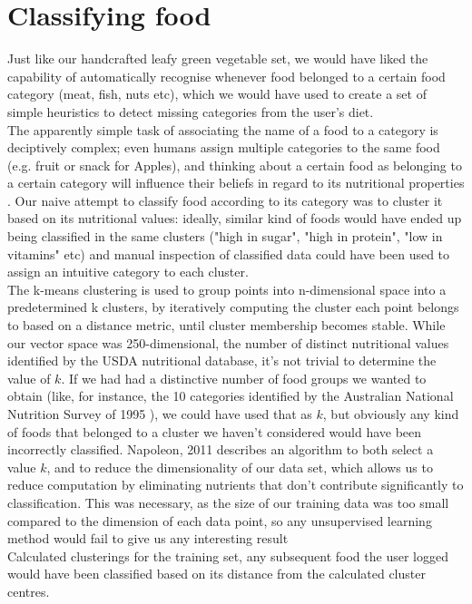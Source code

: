 \section*{Classifying food}
Just like our handcrafted leafy green vegetable set, we would have liked the capability of automatically recognise whenever food belonged to a certain food category (meat, fish, nuts etc), which we would have used to create a set of simple heuristics to detect missing categories from the user's diet. \\
The apparently simple task of associating the name of a food to a category is deciptively complex; even humans assign multiple categories to the same food (e.g. fruit or snack for Apples), and thinking about a certain food as belonging to a certain category will influence their beliefs in regard to its nutritional properties \cite{Hayes2011}.
Our naive attempt to classify food  according to its category was to cluster it based on its nutritional values: ideally, similar kind of foods would have ended up being classified in the same clusters ("high in sugar", "high in protein", "low in vitamins" etc) and manual inspection of classified data could have been used to assign an intuitive category to each cluster. \\
The k-means clustering is used to group points into n-dimensional space into a predetermined k clusters, by iteratively computing the cluster each point belongs to based on a distance metric, until cluster membership becomes stable. While our vector space was 250-dimensional, the number of distinct nutritional values identified by the USDA nutritional database, it's not trivial to determine the value of $k$. If we had had a distinctive number of food groups we wanted to obtain (like, for instance, the 10 categories identified by the Australian National Nutrition Survey of 1995 \cite{NSS1995}), we could have used that as $k$, but obviously any kind of foods that belonged to a cluster we haven't considered would have been incorrectly classified. Napoleon, 2011 \cite{Napoleon, 2011} describes an algorithm to both select a value $k$, and to reduce the dimensionality of our data set, which allows us to reduce computation by eliminating nutrients that don't contribute significantly to classification. This was necessary, as the size of our training data was too small compared to the dimension of each data point, so any unsupervised learning method would fail to give us any interesting result \cite{} \\
Calculated clusterings for the training set, any subsequent food the user logged would have been classified based on its distance from the calculated cluster centres.
